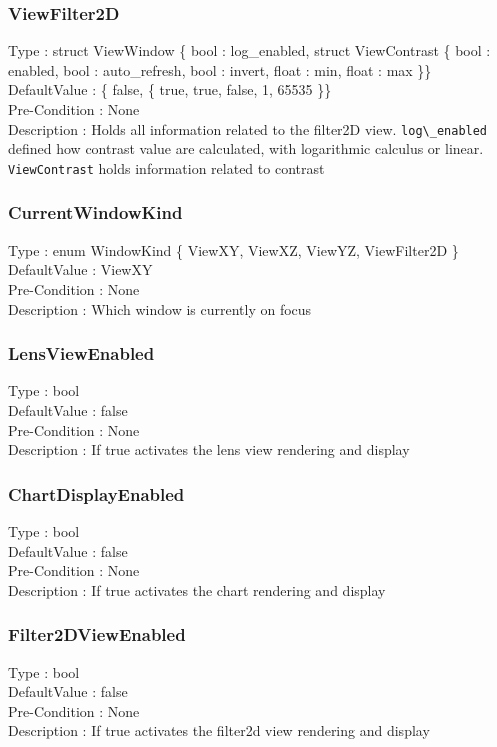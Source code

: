 \subsubsection{ViewFilter2D}
\noindent
Type : struct ViewWindow \{ bool : log\_enabled, struct ViewContrast \{ bool : enabled, bool : auto\_refresh, bool : invert, float : min, float : max \}\}\\
DefaultValue : \{ false, \{ true, true, false, 1, 65535 \}\}\\
Pre-Condition : None\\
Description : Holds all information related to the filter2D view. \verb|log\_enabled| defined how contrast value are calculated, with logarithmic calculus or linear. \verb|ViewContrast| holds information related to contrast\\

\subsubsection{CurrentWindowKind}
\noindent
Type : enum WindowKind \{ ViewXY, ViewXZ, ViewYZ, ViewFilter2D \}\\
DefaultValue : ViewXY\\
Pre-Condition : None\\
Description : Which window is currently on focus\\

\subsubsection{LensViewEnabled}
\noindent
Type : bool\\
DefaultValue : false\\
Pre-Condition : None\\
Description : If true activates the lens view rendering and display\\

\subsubsection{ChartDisplayEnabled}
\noindent
Type : bool\\
DefaultValue : false\\
Pre-Condition : None\\
Description : If true activates the chart rendering and display\\

\subsubsection{Filter2DViewEnabled}
\noindent
Type : bool\\
DefaultValue : false\\
Pre-Condition : None\\
Description : If true activates the filter2d view rendering and display\\

